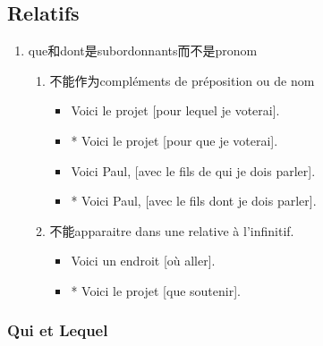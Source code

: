 \documentclass[UTF8]{report}
\begin{document}
\subsection{Relatifs}
\begin{enumerate}
    \item que和dont是subordonnants而不是pronom
    \begin{enumerate}
        \item 不能作为compléments de préposition ou de nom
        \begin{itemize}
            \item Voici le projet [pour lequel je voterai].
            \item * Voici le projet [pour que je voterai].
            \item Voici Paul, [avec le fils de qui je dois parler].
            \item * Voici Paul, [avec le fils dont je dois parler].
        \end{itemize}
        \item 不能apparaitre dans une relative à l’infinitif.
        \begin{itemize}
            \item Voici un endroit [où aller].
            \item * Voici le projet [que soutenir].
        \end{itemize}
    \end{enumerate}
\end{enumerate}

\subsubsection{Qui et Lequel}
\end{document}
